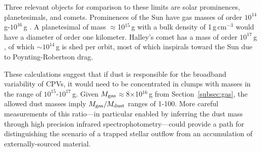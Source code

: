 \documentclass{nature3}
\begin{document}
\begin{methods}
Three relevant objects for comparison to these limits are solar
prominences, planetesimals, and comets.  Prominences of the Sun have
gas masses of order $10^{14}$\,g-$10^{16}$\,g \cite{VialEngvold2015}.
A planetesimal of mass $\approx$10$^{15}$\,g with a bulk density of
1\,g\,cm$^{-3}$ would have a diameter of order one kilometer.
Halley's comet has a mass of order $10^{17}$\,g \cite{Rickman1989}, of
which $\sim$$10^{14}$\,g is shed per orbit, most of which inspirals
toward the Sun due to Poynting-Robertson drag.

These calculations suggest that if dust is responsible for the
broadband variability of CPVs, it would need to be concentrated in
clumps with masses in the range of $10^{15}$-$10^{17}$\,g.  Given
$M_{\rm gas}$$\approx$8$\times$10$^{16}$\,g from
Section~\ref{subsec:gas}, the allowed dust masses imply $M_{\rm
gas}/M_{\rm dust}$ ranges of 1-100.  More careful measurements of this
ratio---in particular enabled by inferring the dust mass through high
precision infrared spectrophotometry---could provide a path for
distinguishing the scenario of a trapped stellar outflow from an accumulation
of externally-sourced material.





\end{methods}
\end{document}
